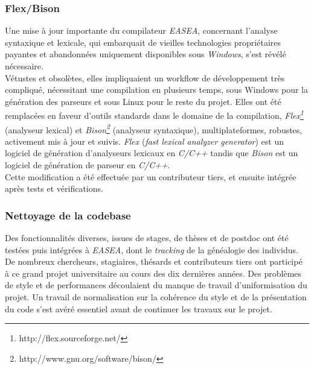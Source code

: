 \documentclass[french, 11pt]{memoir}
\begin{document}
\subsubsection{Flex/Bison}\label{flexbison}

Une mise à jour importante du compilateur \emph{EASEA}, concernant
l'analyse syntaxique et lexicale, qui embarquait de vieilles
technologies propriétaires payantes et abandonnées uniquement
disponibles sous \emph{Windows}, s'est révélé nécessaire. \\ Vétustes et
obsolètes, elles impliquaient un workflow de développement très
compliqué, nécessitant une compilation en plusieurs temps, sous Windows
pour la génération des parseurs et sous Linux pour le reste du projet. 
Elles ont été remplacées en faveur d'outils standards dans le domaine de
la compilation, \emph{Flex\footnote{http://flex.sourceforge.net/}} (analyseur lexical) et \emph{Bison\footnote{http://www.gnu.org/software/bison/}}
(analyseur syntaxique), multiplateformes, robustes, activement mis à
jour et suivis. \emph{Flex }(\emph{fast lexical analyzer generator}) est
un logiciel de génération d'analyseurs lexicaux en \textit{C/C++} tandis que
\emph{Bison} est un logiciel de génération de parseur en \textit{C/C++}. \\ Cette
modification a été effectuée par un contributeur tiers, et ensuite
intégrée après tests et vérifications.

\subsubsection{Nettoyage de la codebase}\label{nettoyage-de-la-codebase}

Des fonctionnalités diverses, issues de stages, de thèses et de postdoc
ont été testées puis intégrées à \emph{EASEA}, dont le \emph{tracking}
de la généalogie des individus. \\
De nombreux chercheurs, stagiaires, thésards et contributeurs tiers ont
participé à ce grand projet universitaire au cours des dix dernières
années. Des problèmes de style et de performances découlaient du manque
de travail d'uniformisation du projet. Un travail de normalisation sur
la cohérence du style et de la présentation du code s'est avéré
essentiel avant de continuer les travaux sur le projet.
\end{document}
